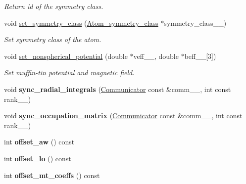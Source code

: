 \begin{DoxyCompactItemize}
\begin{DoxyCompactList}\small\item\em Return id of the symmetry class. \end{DoxyCompactList}\item 
void \hyperlink{classsirius_1_1_atom_a671001eb2220c523d0b52eab409ef368}{set\+\_\+symmetry\+\_\+class} (\hyperlink{classsirius_1_1_atom__symmetry__class}{Atom\+\_\+symmetry\+\_\+class} $\ast$symmetry\+\_\+class\+\_\+\+\_\+)
\begin{DoxyCompactList}\small\item\em Set symmetry class of the atom. \end{DoxyCompactList}\item 
void \hyperlink{classsirius_1_1_atom_aa531003c5aa71b9282b95ff2dfaa1d22}{set\+\_\+nonspherical\+\_\+potential} (double $\ast$veff\+\_\+\+\_\+, double $\ast$beff\+\_\+\+\_\+\mbox{[}3\mbox{]})
\begin{DoxyCompactList}\small\item\em Set muffin-\/tin potential and magnetic field. \end{DoxyCompactList}\item 
\hypertarget{classsirius_1_1_atom_a3a50311e3295105baeb580e20e52937a}{}void {\bfseries sync\+\_\+radial\+\_\+integrals} (\hyperlink{classsddk_1_1_communicator}{Communicator} const \&comm\+\_\+\+\_\+, int const rank\+\_\+\+\_\+)\label{classsirius_1_1_atom_a3a50311e3295105baeb580e20e52937a}

\item 
\hypertarget{classsirius_1_1_atom_a9ee2ec97a697b092799580705611345a}{}void {\bfseries sync\+\_\+occupation\+\_\+matrix} (\hyperlink{classsddk_1_1_communicator}{Communicator} const \&comm\+\_\+\+\_\+, int const rank\+\_\+\+\_\+)\label{classsirius_1_1_atom_a9ee2ec97a697b092799580705611345a}

\item 
\hypertarget{classsirius_1_1_atom_afac0b9d792ee77c1287ea3c7cce0989c}{}int {\bfseries offset\+\_\+aw} () const \label{classsirius_1_1_atom_afac0b9d792ee77c1287ea3c7cce0989c}

\item 
\hypertarget{classsirius_1_1_atom_acd13ef898517a5d03586c8c8927aa951}{}int {\bfseries offset\+\_\+lo} () const \label{classsirius_1_1_atom_acd13ef898517a5d03586c8c8927aa951}

\item 
\hypertarget{classsirius_1_1_atom_aa767096617d0590bd65c532937a895d3}{}int {\bfseries offset\+\_\+mt\+\_\+coeffs} () const \label{classsirius_1_1_atom_aa767096617d0590bd65c532937a895d3}


\end{DoxyCompactItemize}
